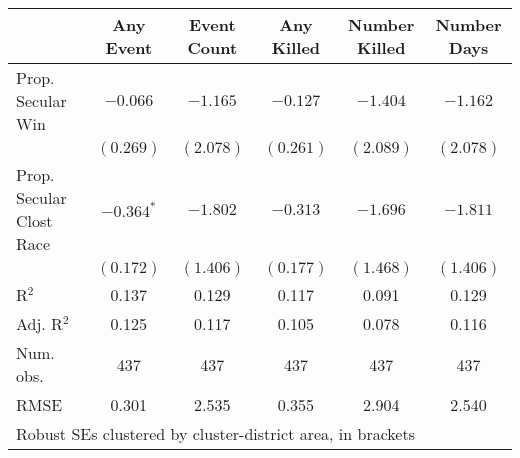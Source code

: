 
\begin{tabular}{l c c c c c }
\hline
 & Any Event & Event Count & Any Killed & Number Killed & Number Days \\
\hline
Prop. Secular Win        & $-0.066$     & $-1.165$  & $-0.127$  & $-1.404$  & $-1.162$  \\
                         & $(0.269)$    & $(2.078)$ & $(0.261)$ & $(2.089)$ & $(2.078)$ \\
Prop. Secular Clost Race & $-0.364^{*}$ & $-1.802$  & $-0.313$  & $-1.696$  & $-1.811$  \\
                         & $(0.172)$    & $(1.406)$ & $(0.177)$ & $(1.468)$ & $(1.406)$ \\
\hline
R$^2$                    & 0.137        & 0.129     & 0.117     & 0.091     & 0.129     \\
Adj. R$^2$               & 0.125        & 0.117     & 0.105     & 0.078     & 0.116     \\
Num. obs.                & 437          & 437       & 437       & 437       & 437       \\
RMSE                     & 0.301        & 2.535     & 0.355     & 2.904     & 2.540     \\
\hline
\multicolumn{6}{l}{\scriptsize{Robust SEs clustered by cluster-district area, in brackets}}
\end{tabular}
